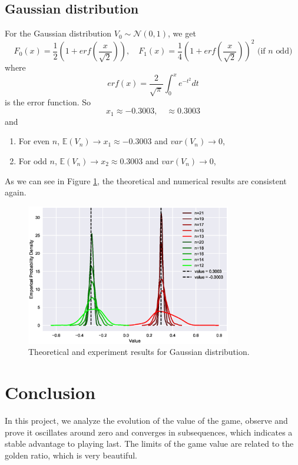 \documentclass[a4paper,english]{article}
\newcommand{\pth}[1]{\left( #1 \right)}
\begin{document}
\begin{spacing}{1.4}
\subsection{Gaussian distribution}
For the Gaussian distribution $V_0 \sim \mathcal{N}(0, 1)$, we get
\begin{equation*}
  F_0(x) = \frac 12 \pth{1+erf(\frac{x}{\sqrt{2}})}, \quad F_1(x) = \frac 14 \pth{1+erf(\frac{x}{\sqrt{2}})}^2 \text{ (if $n$ odd)}
\end{equation*}
where
\begin{equation*}
  erf(x) = \frac{2}{\sqrt{\pi}} \int_0^x e^{-t^2} dt
\end{equation*}
is the error function. So
\begin{equation}
  x_1 \approx -0.3003, \quad \approx 0.3003
\end{equation}
and
\begin{enumerate}
  \item For even $n$, $\mathbb{E} (V_n) \to x_1\approx -0.3003$ and $var(V_n) \to 0$,
  \item For odd $n$, $\mathbb{E} (V_n) \to x_2 \approx 0.3003$ and $var(V_n) \to 0$,
\end{enumerate}

As we can see in Figure \ref{Gaussian}, the theoretical and numerical results are consistent again.

\begin{figure}[!htb]
\centering
\includegraphics[width=0.8\textwidth]{figures/plot6.eps}
\caption{Theoretical and experiment results for Gaussian distribution.}
\label{Gaussian}
\end{figure}

\section{Conclusion}
In this project, we analyze the evolution of the value of the game, observe and prove it oscillates around zero and converges in subsequences, which indicates a stable advantage to playing last. The limits of the game value are related to the golden ratio, which is very beautiful.

\vspace{5em}









\end{spacing}
\end{document}
